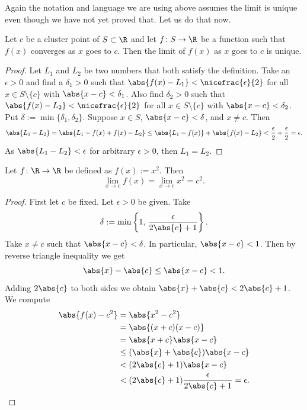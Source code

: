 \documentclass[12pt]{book}
\begin{document}
Again the notation and language we are using above assumes the limit
is unique even though we have not yet proved that.
Let us do that now.

\begin{prop}
Let $c$ be a cluster point of $S \subset \R$ and let $f \colon S \to \R$
be a function such that $f(x)$ converges as $x$ goes to $c$.
Then
the limit of $f(x)$ as $x$ goes to $c$ is unique.
\end{prop}

\begin{proof}
Let $L_1$ and $L_2$ be two numbers that both satisfy the definition.
Take an $\epsilon > 0$ and find a $\delta_1 > 0$ such that
$\abs{f(x)-L_1} < \nicefrac{\epsilon}{2}$ 
for all $x \in S \setminus \{c\}$ with $\abs{x-c} < \delta_1$.
Also find $\delta_2 > 0$ such that
$\abs{f(x)-L_2} < \nicefrac{\epsilon}{2}$
for all $x \in S \setminus \{c\}$ with $\abs{x-c} < \delta_2$.
Put $\delta := \min \{ \delta_1, \delta_2 \}$.
Suppose $x \in S$,
$\abs{x-c} < \delta$, and $x \not= c$.
Then
\begin{equation*}
\abs{L_1 - L_2} =
\abs{L_1 - f(x) + f(x) - L_2} \leq
\abs{L_1 - f(x)} + \abs{f(x) - L_2} < \frac{\epsilon}{2} + \frac{\epsilon}{2}
= \epsilon.
\end{equation*}
As $\abs{L_1-L_2} < \epsilon$ for arbitrary $\epsilon > 0$, then
$L_1 = L_2$.
\end{proof}

\begin{example}
Let $f \colon \R \to \R$ be defined as $f(x) := x^2$.
Then
\begin{equation*}
\lim_{x\to c} f(x) = \lim_{x\to c} x^2 = c^2 .
\end{equation*}

\begin{proof} First let $c$ be fixed.
Let $\epsilon > 0$ be given.
Take
\begin{equation*}
\delta := \min \left\{ 1 , \, \frac{\epsilon}{2\abs{c}+1} \right\} .
\end{equation*}
Take $x \not= c$ such that $\abs{x-c} < \delta$.
In particular,
$\abs{x-c} < 1$.
Then by reverse triangle inequality we get
\begin{equation*}
\abs{x}-\abs{c} \leq \abs{x-c} < 1 .
\end{equation*}
Adding $2\abs{c}$ to both sides we obtain
$\abs{x} + \abs{c} < 2\abs{c} + 1$.
We compute
\begin{equation*}
\begin{split}
\abs{f(x) - c^2} &= \abs{x^2-c^2} \\
&= \abs{(x+c)(x-c)} \\
&= \abs{x+c}\abs{x-c} \\
&\leq (\abs{x}+\abs{c})\abs{x-c} \\
&< (2\abs{c}+1)\abs{x-c} \\
&< (2\abs{c}+1)\frac{\epsilon}{2\abs{c}+1} = \epsilon .
\end{split}
\end{equation*}
\end{proof}
\end{example}
\end{document}
